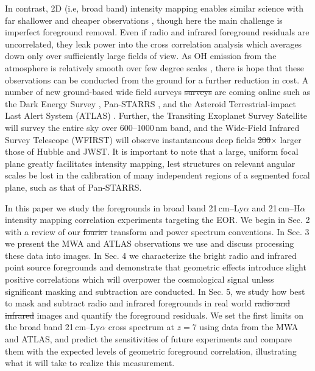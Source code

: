 \documentclass[numberedappendix]{emulateapj}
\providecommand{\DIFadd}[1]{{\protect\color{blue}\uwave{#1}}} %
\providecommand{\DIFdel}[1]{{\protect\color{red}\sout{#1}}}                      %
\providecommand{\DIFaddbegin}{} %
\providecommand{\DIFaddend}{} %
\providecommand{\DIFdelbegin}{} %
\providecommand{\DIFdelend}{} %
\begin{document}
In contrast, 2D (i.e, broad band) intensity mapping enables similar science with far shallower and cheaper observations \citep{StarsAndReionization,mao14}, though here the main challenge is imperfect foreground removal. Even if radio and infrared foreground residuals are uncorrelated, they leak power into the cross correlation analysis which averages down only over sufficiently large fields of view. As OH emission from the atmosphere is relatively smooth over few degree scales \citep{high10}, there is hope that these observations can be conducted from the ground for a further reduction in cost. A number of new ground-based wide field surveys \DIFdelbegin \DIFdel{surveys }\DIFdelend are coming online such as the Dark Energy Survey \citep{des16}, Pan-STARRS \citep{tonry12}, and the Asteroid Terrestrial-impact Last Alert System (ATLAS) \citep{tonry11}. Further, the Transiting Exoplanet Survey Satellite \citep{ricker14} will survey the entire sky over 600--1000\,nm band, and the Wide-Field Infrared Survey Telescope (WFIRST) \citep{Spergel2013} will observe instantaneous deep fields \DIFdelbegin \DIFdel{200}\DIFdelend \DIFaddbegin \DIFadd{100}\DIFaddend $\times$ larger those of Hubble and JWST. It is important to note that a large, uniform focal plane greatly facilitates intensity mapping, lest structures on relevant angular scales be lost in the calibration of many independent regions of a segmented focal plane, such as that of Pan-STARRS. 

In this paper we study the foregrounds in broad band 21\,cm--Ly$\alpha$ and 21\,cm--H$\alpha$ intensity mapping correlation experiments targeting the EOR. We begin in Sec. 2 with a review of our \DIFdelbegin \DIFdel{fourier }\DIFdelend \DIFaddbegin \DIFadd{Fourier }\DIFaddend transform and power spectrum conventions.
  In Sec. 3 we present the MWA and ATLAS observations we use and discuss processing these data into images. 
   In Sec. 4 we characterize the bright radio and infrared point source foregrounds and 
   demonstrate that geometric effects introduce slight positive correlations which will overpower the cosmological signal
   unless significant masking and subtraction are conducted. 
   In Sec. 5, we study how best to mask and subtract radio and infrared foregrounds in real world \DIFdelbegin \DIFdel{radio and infrared }\DIFdelend images and 
   quantify the foreground residuals. We set the first limits 
   on \DIFaddbegin \DIFadd{residual foregrounds of the }\DIFaddend the broad band 21\,cm--Ly$\alpha$ cross spectrum at \DIFdelbegin \DIFdel{$z=7$ }\DIFdelend \DIFaddbegin \DIFadd{$z\sim7$ }\DIFaddend using data from the MWA
     and ATLAS, and predict the sensitivities of future experiments and compare them with the expected levels of geometric foreground correlation, 
     illustrating what it will take to realize this measurement.
\end{document}

